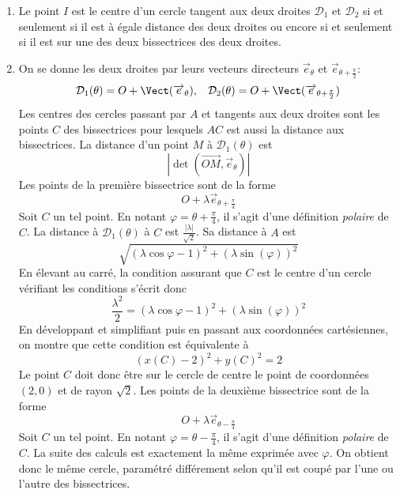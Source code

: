 \begin{enumerate}
 \item Le point $I$ est le centre d'un cercle tangent aux deux droites $\mathcal{D}_1$ et $\mathcal{D}_2$ si et seulement si il est à égale distance des deux droites ou encore si et seulement si il est sur une des deux bissectrices des deux droites.
 \item On se donne les deux droites par leurs vecteurs directeurs $\overrightarrow{e}_\theta$ et $\overrightarrow{e}_{\theta +\frac{\pi}{2}}$:
\begin{displaymath}
 \mathcal{D}_1(\theta)= O+\Vect(\overrightarrow{e}_\theta),\hspace{0.3cm}
 \mathcal{D}_2(\theta)= O+\Vect(\overrightarrow{e}_{\theta +\frac{\pi}{2}})
\end{displaymath}
Les centres des cercles passant par $A$ et tangents aux deux droites sont les points $C$ des bissectrices pour lesquels $AC$ est aussi la distance aux bissectrices.\newline
La distance d'un point $M$ à $\mathcal{D}_1(\theta)$ est 
\begin{displaymath}
|\det(\overrightarrow{OM},\overrightarrow{e}_\theta)| 
\end{displaymath}
Les points de la première bissectrice sont de la forme
 \begin{displaymath}
  O+\lambda \overrightarrow{e}_{\theta +\frac{\pi}{4}}
 \end{displaymath}
Soit $C$ un tel point. En notant $\varphi = \theta +\frac{\pi}{4}$, il s'agit d'une définition \emph{polaire} de $C$. La distance à $\mathcal{D}_1(\theta)$ à $C$ est $\frac{|\lambda|}{\sqrt{2}}$. Sa distance à $A$ est
\begin{displaymath}
 \sqrt{(\lambda\cos \varphi -1)^2 + (\lambda\sin(\varphi))^2}
\end{displaymath}
En élevant au carré, la condition assurant que $C$ est le centre d'un cercle vérifiant les conditions s'écrit donc
\begin{displaymath}
 \frac{\lambda^2}{2}=
(\lambda\cos \varphi -1)^2 + (\lambda\sin(\varphi))^2
\end{displaymath}
En développant et simplifiant puis en passant aux coordonnées cartésiennes, on montre que cette condition est équivalente à
\begin{displaymath}
 (x(C)-2)^2 + y(C)^2 = 2
\end{displaymath}
Le point $C$ doit donc être sur le cercle de centre le point de coordonnées $(2,0)$ et de rayon $\sqrt{2}$.\newline
Les points de la deuxième bissectrice sont de la forme
 \begin{displaymath}
  O+\lambda \overrightarrow{e}_{\theta -\frac{\pi}{4}}
 \end{displaymath}
Soit $C$ un tel point. En notant $\varphi = \theta -\frac{\pi}{4}$, il s'agit d'une définition \emph{polaire} de $C$. La suite des calculs est exactement la même exprimée avec $\varphi$. On obtient donc le même cercle, paramétré différement selon qu'il est coupé par l'une ou l'autre des bissectrices.
\end{enumerate}